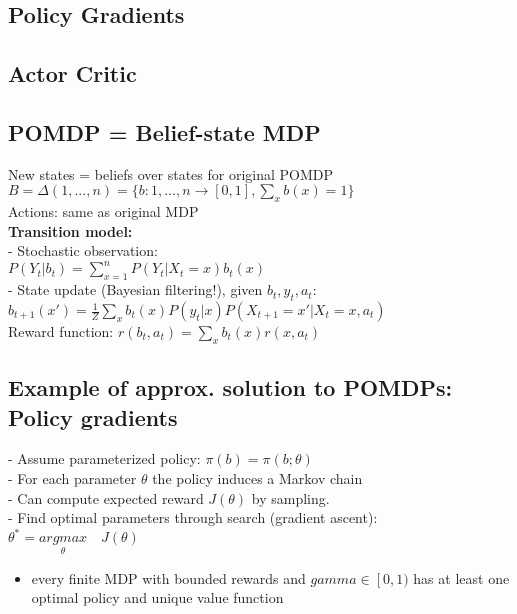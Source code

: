 \subsection{Policy Gradients}
\subsection{Actor Critic}








\subsection{POMDP = Belief-state MDP}
New states = beliefs over states for original POMDP\\
$B=\Delta({1,...,n})=\{ b:{1,...,n} \rightarrow [0,1],\sum_x b(x)=1 \}$\\
Actions: same as original MDP\\
\textbf{Transition model:}\\
- Stochastic observation:\\
$P(Y_t|b_t)=\sum_{x=1}^n P(Y_t|X_t=x)b_t(x)$\\
- State update (Bayesian filtering!), given $b_t, y_t, a_t$:
$b_{t+1}(x')=\frac{1}{Z}\sum_xb_t(x)P(y_t|x)P(X_{t+1}=x'|X_t=x,a_t)$\\
Reward function: $r(b_t, a_t)=\sum_x b_t(x)r(x,a_t)$

\subsection{Example of approx. solution to POMDPs: Policy gradients}
- Assume parameterized policy: $\pi(b)=\pi(b;\theta)$\\
- For each parameter $\theta$ the policy induces a Markov chain\\
- Can compute expected reward $J(\theta)$ by sampling.\\
- Find optimal parameters through search (gradient ascent):
$\theta^* = \underset{\theta}{arg max}\quad J(\theta)$


\begin{itemize}
    \item every finite MDP with bounded rewards and $gamma \in \left[ 0,1)$ has at least one optimal policy and
    unique value function
\end{itemize}